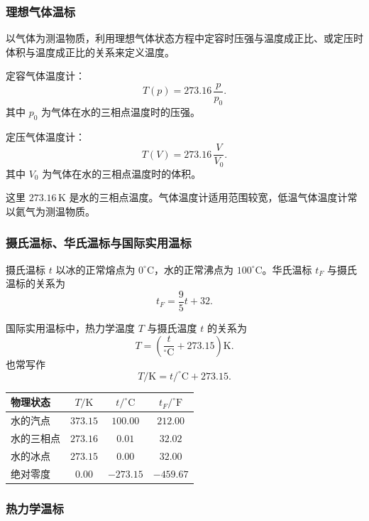 \subsubsection{理想气体温标}

以气体为测温物质，利用理想气体状态方程中定容时压强与温度成正比、或定压时体积与温度成正比的关系来定义温度。

\begin{FormulaBox}[气体温度计]
定容气体温度计：
\[
  T(p)=273.16\,\frac{p}{p_0}.
\]
其中 \(p_0\) 为气体在水的三相点温度时的压强。

定压气体温度计：
\[
  T(V)=273.16\,\frac{V}{V_0}.
\]
其中 \(V_0\) 为气体在水的三相点温度时的体积。
\end{FormulaBox}

这里 \(273.16\,\mathrm K\) 是水的三相点温度。气体温度计适用范围较宽，低温气体温度计常以氦气为测温物质。

\subsubsection{摄氏温标、华氏温标与国际实用温标}

摄氏温标 \(t\) 以冰的正常熔点为 \(0^\circ\mathrm C\)，水的正常沸点为 \(100^\circ\mathrm C\)。华氏温标 \(t_F\) 与摄氏温标的关系为
\[
  t_F=\frac{9}{5}t+32.
\]

国际实用温标中，热力学温度 \(T\) 与摄氏温度 \(t\) 的关系为
\[
  T=\left(\frac{t}{^\circ\mathrm C}+273.15\right)\mathrm K.
\]
也常写作
\[
  T/\mathrm K=t/^\circ\mathrm C+273.15.
\]

\begin{FormulaBox}[常见温度点]
\begin{tabularx}{\textwidth}{@{}lccc@{}}
\toprule
物理状态 & \(T/\mathrm K\) & \(t/^\circ\mathrm C\) & \(t_F/^\circ\mathrm F\)\\
\midrule
水的汽点 & \(373.15\) & \(100.00\) & \(212.00\)\\
水的三相点 & \(273.16\) & \(0.01\) & \(32.02\)\\
水的冰点 & \(273.15\) & \(0.00\) & \(32.00\)\\
绝对零度 & \(0.00\) & \(-273.15\) & \(-459.67\)\\
\bottomrule
\end{tabularx}
\end{FormulaBox}

\subsubsection{热力学温标}

